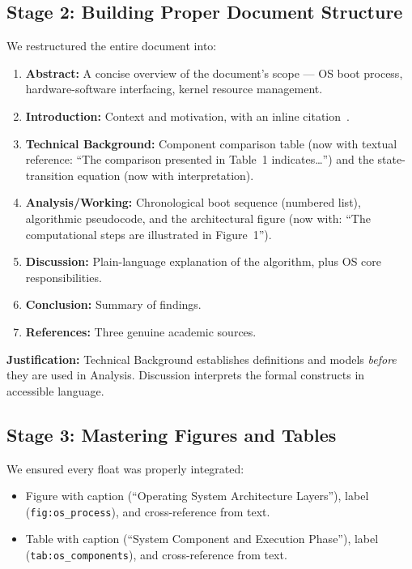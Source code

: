 \documentclass[11pt, a4paper]{article}
\begin{document}
\subsection{Stage 2: Building Proper Document Structure}
We restructured the entire document into:
\begin{enumerate}[nosep]
    \item \textbf{Abstract:} A concise overview of the document's scope --- OS boot process, hardware-software interfacing, kernel resource management.
    \item \textbf{Introduction:} Context and motivation, with an inline citation~\cite{silberschatz}.
    \item \textbf{Technical Background:} Component comparison table (now with textual reference: ``The comparison presented in Table~1 indicates\ldots'') and the state-transition equation (now with interpretation).
    \item \textbf{Analysis/Working:} Chronological boot sequence (numbered list), algorithmic pseudocode, and the architectural figure (now with: ``The computational steps are illustrated in Figure~1'').
    \item \textbf{Discussion:} Plain-language explanation of the algorithm, plus OS core responsibilities.
    \item \textbf{Conclusion:} Summary of findings.
    \item \textbf{References:} Three genuine academic sources.
\end{enumerate}

\textbf{Justification:} Technical Background establishes definitions and models \emph{before} they are used in Analysis. Discussion interprets the formal constructs in accessible language.

\subsection{Stage 3: Mastering Figures and Tables}
We ensured every float was properly integrated:
\begin{itemize}[nosep]
    \item Figure with caption (``Operating System Architecture Layers''), label (\texttt{fig:os\_process}), and cross-reference from text.
    \item Table with caption (``System Component and Execution Phase''), label (\texttt{tab:os\_components}), and cross-reference from text.
\end{itemize}
\end{document}
